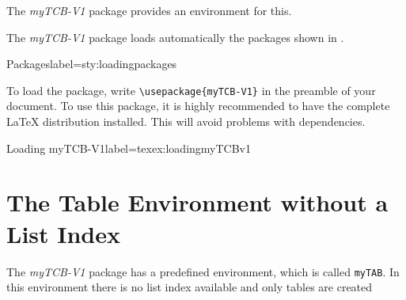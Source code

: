 \documentclass[]{myHOWTO-V001}
\begin{document}
The \emph{myTCB-V1} package provides an environment for this.

The \emph{myTCB-V1} package loads automatically the packages shown in .

\begin{mySTYdoclst}{Packages}{label={sty:loadingpackages}}
\RequirePackage{lipsum}

\RequirePackage{graphicx}
\RequirePackage{wrapfig}

\RequirePackage{xcolor}

\RequirePackage{tabularx}
\RequirePackage{colortbl}
\RequirePackage{multirow}

\RequirePackage{verbatim}
\RequirePackage{fancyvrb}
\RequirePackage{listings}

\RequirePackage{float}

\RequirePackage{refstyle}

\RequirePackage{tcolorbox}
\end{mySTYdoclst}

To load the package, write \Verb|\usepackage{myTCB-V1}| in the preamble of your document. To use this package, it is highly recommended to have the complete \LaTeX{} distribution installed. This will avoid problems with dependencies.

\begin{myTEXEXdoclst}{Loading myTCB-V1}{label={texex:loadingmyTCBv1}}
\usepackage{myTCB-V1}
\end{myTEXEXdoclst}

%
%

\section{The Table Environment without a List Index}

The \emph{myTCB-V1} package has a predefined environment, which is called \Verb|myTAB|. In this environment there is no list index available and only tables are created
\end{document}
